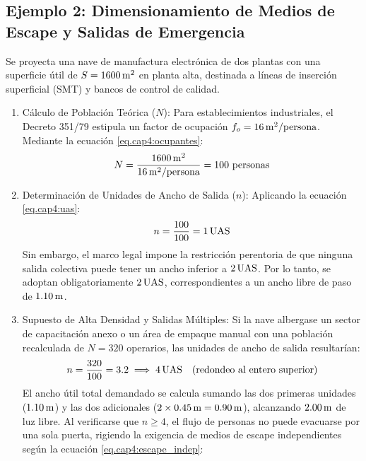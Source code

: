 \subsection{Ejemplo 2: Dimensionamiento de Medios de Escape y Salidas de Emergencia}
\label{sec.cap4:ejemplo_uas}

Se proyecta una nave de manufactura electrónica de dos plantas con una superficie útil de $S = 1600\,\mathrm{m}^2$ en planta alta,
destinada a líneas de inserción superficial (SMT) y bancos de control de calidad.

\begin{enumerate}
    \item Cálculo de Población Teórica ($N$): Para establecimientos industriales, el Decreto 351/79 estipula un factor de
          ocupación $f_o = 16\,\mathrm{m}^2/\text{persona}$. Mediante la ecuación \ref{eq.cap4:ocupantes}:
          \begin{equation}
          N = \frac{1600\,\mathrm{m}^2}{16\,\mathrm{m}^2/\text{persona}} = 100 \text{ personas}
          \end{equation}
    \item Determinación de Unidades de Ancho de Salida ($n$): Aplicando la ecuación \ref{eq.cap4:uas}:
          \begin{equation}
          n = \frac{100}{100} = 1\,\mathrm{UAS}
          \end{equation}
          Sin embargo, el marco legal impone la restricción perentoria de que ninguna salida colectiva puede tener un ancho
          inferior a $2\,\mathrm{UAS}$. Por lo tanto, se adoptan obligatoriamente $2\,\mathrm{UAS}$, correspondientes a un ancho libre de paso
          de $1.10\,\mathrm{m}$.
    \item Supuesto de Alta Densidad y Salidas Múltiples: Si la nave albergase un sector de capacitación anexo o un área de
          empaque manual con una población recalculada de $N = 320$ operarios, las unidades de ancho de salida resultarían:
          \begin{equation}
          n = \frac{320}{100} = 3.2 \implies 4\,\mathrm{UAS} \quad (\text{redondeo al entero superior})
          \end{equation}
          El ancho útil total demandado se calcula sumando las dos primeras unidades ($1.10\,\mathrm{m}$) y las dos adicionales
          ($2 \times 0.45\,\mathrm{m} = 0.90\,\mathrm{m}$), alcanzando $2.00\,\mathrm{m}$ de luz libre. Al verificarse que $n \ge 4$, el flujo de personas
          no puede evacuarse por una sola puerta, rigiendo la exigencia de medios de escape independientes según la
          ecuación \ref{eq.cap4:escape_indep}:
          \begin{equation}

\end{equation}
\end{enumerate}
